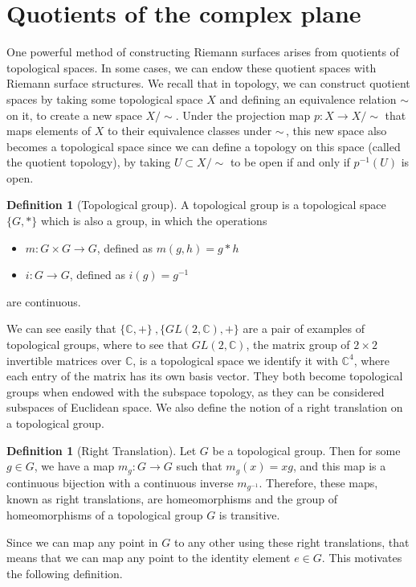 \documentclass[11pt]{report}
\theoremstyle{definition}
\newtheorem{defn}[thm]{Definition}
\begin{document}
\section{Quotients of the complex plane}\label{QuotientSection}
One powerful method of constructing Riemann surfaces arises from quotients of topological spaces. In some cases, we can endow these quotient spaces with Riemann surface structures. We recall that in topology, we can construct quotient spaces by taking some topological space $X$ and defining an equivalence relation $\sim$ on it, to create a new space $X/\sim$. Under the projection map $p \colon X \rightarrow X/\sim$ that maps elements of $X$ to their equivalence classes under $\sim$\,, this new space also becomes a topological space since we can define a topology on this space (called the quotient topology), by taking $U \subset X/\sim$ to be open if and only if $p^{-1}(U)$ is open.
\begin{defn}[Topological group]
  A topological group is a topological space $\{G,*\}$ which is also a group, in which the operations
  \begin{itemize}
    \item $m:G \times G \rightarrow G$, defined as $m(g,h)=g*h$
    \item $i:G \rightarrow G$, defined as $i(g)=g^{-1}$
  \end{itemize}
  are continuous.
\end{defn}
We can see easily that $\{\mathbb{C}, + \} \ ,\{GL(2,\mathbb{C}), +\}$ are a pair of examples of topological groups, where to see that $GL(2,\mathbb{C})$, the matrix group of $2\times 2$ invertible matrices over $\mathbb{C}$, is a topological space we identify it with $\mathbb{C}^4$, where each entry of the matrix has its own basis vector. They both become topological groups when endowed with the subspace topology, as they can be considered subspaces of Euclidean space. We also define the notion of a right translation on a topological group.
\begin{defn}[Right Translation]
  Let $G$ be a topological group. Then for some $g \in G$, we have a map $m_g:G \rightarrow G$ such that $m_g(x) = xg$, and this map is a continuous bijection with a continuous inverse $m_{g^{-1}}$. Therefore, these maps, known as right translations, are homeomorphisms and the group of homeomorphisms of a topological group $G$ is transitive.
\end{defn}
Since we can map any point in $G$ to any other using these right translations, that means that we can map any point to the identity element $e \in G$. This motivates the following definition.
\end{document}
